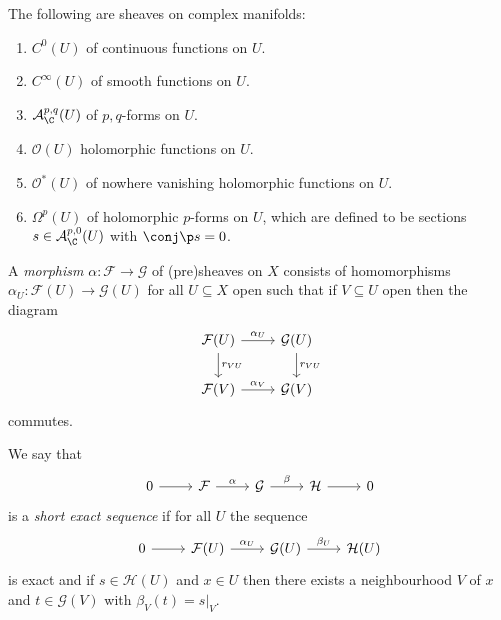 \documentclass[a4paper]{article}
\begin{document}
\begin{eg}
  The following are sheaves on complex manifolds:
  \begin{enumerate}
  \item \(C^0(U)\) of continuous functions on \(U\).
  \item \(C^\infty(U)\) of smooth functions on \(U\).
  \item \(\mathcal A_\C^{p, q}(U)\) of \(p, q\)-forms on \(U\).
  \item \(\mathcal O(U)\) holomorphic functions on \(U\).
  \item \(\mathcal O^*(U)\) of nowhere vanishing holomorphic functions on \(U\).
  \item \(\Omega^p(U)\) of holomorphic \(p\)-forms on \(U\), which are defined to be sections \(s \in \mathcal A_\C^{p, 0}(U)\) with \(\conj \p s = 0\).
  \end{enumerate}
\end{eg}

\begin{definition}
  A \emph{morphism} \(\alpha: \mathcal F \to \mathcal G\) of (pre)sheaves on \(X\) consists of homomorphisms \(\alpha_U: \mathcal F(U) \to \mathcal G(U)\) for all \(U \subseteq X\) open such that if \(V \subseteq U\) open then the diagram
  \[
    \begin{tikzcd}
      \mathcal F(U) \ar[r, "\alpha_U"] \ar[d, "r_{VU}"] & \mathcal G(U) \ar[d, "r_{VU}"] \\
      \mathcal F(V) \ar[r, "\alpha_V"] & \mathcal G(V)
    \end{tikzcd}
  \]
  commutes.
\end{definition}

\begin{definition}
  We say that
  \[
    \begin{tikzcd}
      0 \ar[r] & \mathcal F \ar[r, "\alpha"] & \mathcal G \ar[r, "\beta"] & \mathcal H \ar[r] & 0
    \end{tikzcd}
  \]
  is a \emph{short exact sequence} if for all \(U\) the sequence
  \[
    \begin{tikzcd}
      0 \ar[r] & \mathcal F(U) \ar[r, "\alpha_U"] & \mathcal G(U) \ar[r, "\beta_U"] & \mathcal H(U)
    \end{tikzcd}
  \]
  is exact and if \(s \in \mathcal H(U)\) and \(x \in U\) then there exists a neighbourhood \(V\) of \(x\) and \(t \in \mathcal G(V)\) with \(\beta_V(t) = s|_V\).
\end{definition}
\end{document}
